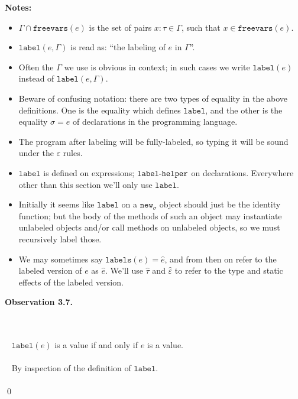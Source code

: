 \documentclass{llncs}
\newcommand{\keywadj}[1]{\mathtt{#1}}
\newcommand{\kwa}[1]{\keywadj{ #1 }}
\newcommand{\hyphen}{\hbox{-}}
\newcommand{\thm}[3]{
	\begin{large}
		\bf{#1}
	\end{large} \\\\
	\fbox{Statement.} ~ #2
	\fbox{Proof.}~ #3 \qed
}
\begin{document}
\noindent \textbf{Notes:}
\begin{itemize}
\item $\Gamma \cap \keywadj{freevars}(e)$ is the set of pairs $x : \tau \in \Gamma$, such that $x \in \keywadj{freevars}(e)$.
\item $\keywadj{label}(e, \Gamma)$ is read as: ``the labeling of $e$ in $\Gamma$''.
\item Often the $\Gamma$ we use is obvious in context; in such cases we write $\kwa{label}(e)$ instead of $\kwa{label}(e, \Gamma)$.
\item Beware of confusing notation: there are two types of equality in the above definitions. One is the equality which defines $\keywadj{label}$, and the other is the equality $\sigma = e$ of declarations in the programming language.
\item The program after labeling will be fully-labeled, so typing it will be sound under the $\varepsilon$ rules.
\item $\keywadj{label}$ is defined on expressions; $\keywadj{label \hyphen helper}$ on declarations. Everywhere other than this section we'll only use $\keywadj{label}$.
\item Initially it seems like $\keywadj{label}$ on a $\keywadj{new_\sigma}$ object should just be the identity function; but the body of the methods of such an object may instantiate unlabeled objects and/or call methods on unlabeled objects, so we must recursively label those.
\item We may sometimes say $\keywadj{labels}(e) = \hat e$, and from then on refer to the labeled version of $e$ as $\hat e$. We'll use $\hat \tau$ and $\hat \varepsilon$ to refer to the type and static effects of the labeled version.\\
\end{itemize}






\noindent
\thm{Observation 3.7.}
{$\keywadj{label}(e)$ is a value if and only if $e$ is a value.\\\\}
{By inspection of the definition of $\keywadj{label}$.\\\\}




\end{document}
